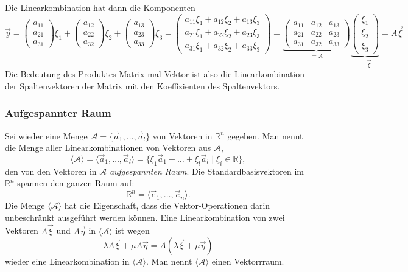 Die Linearkombination hat dann die Komponenten
\[
\vec{y}
=
\begin{pmatrix}a_{11}\\a_{21}\\a_{31}\end{pmatrix}
\xi_1
+
\begin{pmatrix}a_{12}\\a_{22}\\a_{32}\end{pmatrix}
\xi_2
+
\begin{pmatrix}a_{13}\\a_{23}\\a_{33}\end{pmatrix}
\xi_3
=
\begin{pmatrix}
a_{11}\xi_1+a_{12}\xi_2+a_{13}\xi_3\\
a_{21}\xi_1+a_{22}\xi_2+a_{23}\xi_3\\
a_{31}\xi_1+a_{32}\xi_2+a_{33}\xi_3
\end{pmatrix}
=
\underbrace{
\begin{pmatrix}
a_{11}&a_{12}&a_{13}\\
a_{21}&a_{22}&a_{23}\\
a_{31}&a_{32}&a_{33}
\end{pmatrix}}_{\displaystyle=A}
\underbrace{
\begin{pmatrix}
\xi_1\\\xi_2\\\xi_3
\end{pmatrix}}_{\displaystyle=\vec{\xi}}
=
A\vec{\xi}
\]
Die Bedeutung des Produktes Matrix mal Vektor ist also die Linearkombination
der Spaltenvektoren der Matrix mit den Koeffizienten des Spaltenvektors.

\subsubsection{Aufgespannter Raum}
Sei wieder eine Menge $\mathcal{A}=\{\vec{a}_1,\dots,\vec{a}_l\}$
von Vektoren in $\mathbb R^n$ gegeben.
Man nennt die Menge aller Linearkombinationen von Vektoren aus
$\mathcal{A}$,
\[
\langle
\mathcal{A}
\rangle
=
\langle
\vec{a}_1,\dots,\vec{a}_l
\rangle
=
\{
\xi_1\vec{a}_1+\dots+\xi_l\vec{a}_l\;|\; \xi_i\in\mathbb R
\},
\]
den von den Vektoren in $\mathcal{A}$ {\em aufgespannten Raum}.
\label{skript:affin:koordinaten:aufgespannt}
Die Standardbasisvektoren im $\mathbb R^n$ spannen den ganzen Raum
auf:
\[
\mathbb R^n = \langle \vec{e}_1,\dots,\vec{e}_n\rangle.
\]
Die Menge $\langle\mathcal{A}\rangle$ hat die Eigenschaft, dass die
Vektor-Operationen darin unbeschränkt ausgeführt werden können.
Eine Linearkombination von zwei 
Vektoren $A\vec{\xi}$ und $A\vec{\eta}$ in $\langle\mathcal{A}\rangle$
ist wegen
\[
\lambda A\vec{\xi} + \mu A\vec{\eta}
=
A(\lambda\vec{\xi} + \mu\vec{\eta})
\]
wieder eine Linearkombination in $\langle\mathcal{A}\rangle$.
Man nennt $\langle\mathcal{A}\rangle$ einen Vektorrraum.

